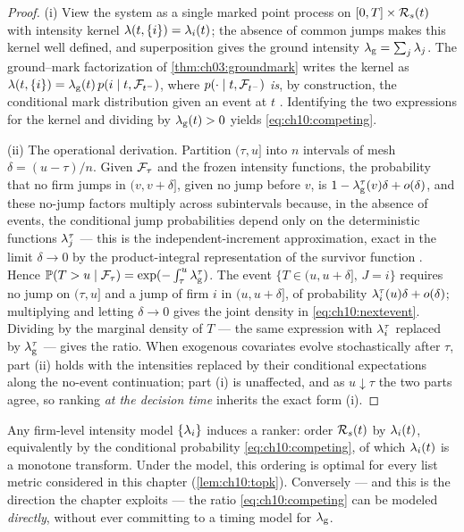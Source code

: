 \begin{proof}
(i) View the system as a single marked point process on $[0,T] \times
\mathcal{R}_s(t)$ with intensity kernel $\lambda(t, \{i\}) = \lambda_i(t)$; the
absence of common jumps makes this kernel well defined, and superposition
gives the ground intensity $\lambda_{\mathrm g} = \sum_j \lambda_j$. The
ground--mark factorization of \cref{thm:ch03:groundmark} writes the
kernel as $\lambda(t,\{i\}) = \lambda_{\mathrm g}(t)\, p(i \mid t, \mathcal{F}_{t^-})$, where
$p(\cdot \mid t, \mathcal{F}_{t^-})$ \emph{is}, by construction, the conditional mark
distribution given an event at $t$ \citep[Ch.~6]{daley2003}. Identifying
the two expressions for the kernel and dividing by $\lambda_{\mathrm g}(t) >
0$ yields \cref{eq:ch10:competing}.

(ii) The operational derivation. Partition $(\tau, u]$ into $n$ intervals
of mesh $\delta = (u-\tau)/n$. Given $\mathcal{F}_\tau$ and the frozen intensity
functions, the probability that no firm jumps in $(v, v+\delta]$, given no
jump before $v$, is $1 - \lambda^{\tau}_{\mathrm g}(v)\delta + o(\delta)$,
and these no-jump factors multiply across subintervals because, in the
absence of events, the conditional jump probabilities depend only on the
deterministic functions $\lambda^{\tau}_j$ --- this is the
independent-increment approximation, exact in the limit $\delta \to 0$ by
the product-integral representation of the survivor function
\citep{abgk1993}. Hence $\mathbb{P}(T > u \mid \mathcal{F}_\tau) = \exp(-\int_\tau^u
\lambda^{\tau}_{\mathrm g})$. The event $\{T \in (u, u+\delta],\, J = i\}$
requires no jump on $(\tau, u]$ and a jump of firm $i$ in $(u,
u+\delta]$, of probability $\lambda^{\tau}_i(u)\delta + o(\delta)$;
multiplying and letting $\delta \to 0$ gives the joint density in
\cref{eq:ch10:nextevent}. Dividing by the marginal density of $T$
--- the same expression with $\lambda^{\tau}_i$ replaced by
$\lambda^{\tau}_{\mathrm g}$ --- gives the ratio. When exogenous covariates
evolve stochastically after $\tau$, part (ii) holds with the intensities
replaced by their conditional expectations along the no-event
continuation; part (i) is unaffected, and as $u \downarrow \tau$ the two
parts agree, so ranking \emph{at the decision time} inherits the exact
form (i).
\end{proof}

\begin{corollary}\label{cor:ch10:induced}
Any firm-level intensity model $\{\lambda_i\}$ induces a ranker: order
$\mathcal{R}_s(t)$ by $\lambda_i(t)$, equivalently by the conditional
probability \cref{eq:ch10:competing}, of which $\lambda_i(t)$ is a monotone
transform. Under the model, this ordering is optimal for every list
metric considered in this chapter (\cref{lem:ch10:topk}). Conversely ---
and this is the direction the chapter exploits --- the ratio
\cref{eq:ch10:competing} can be modeled \emph{directly}, without ever
committing to a timing model for $\lambda_{\mathrm g}$.
\end{corollary}

